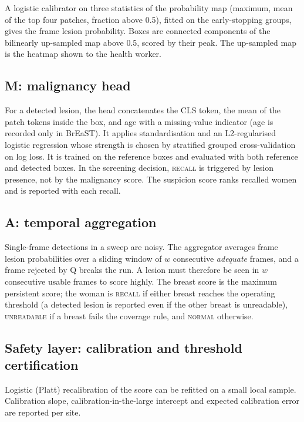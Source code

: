  A logistic calibrator on three statistics of the probability map (maximum, mean of the top four patches, fraction above 0.5), fitted on the early-stopping groups, gives the frame lesion probability. Boxes are connected components of the bilinearly up-sampled map above 0.5, scored by their peak. The up-sampled map is the heatmap shown to the health worker.

\subsection{M: malignancy head}
For a detected lesion, the head concatenates the CLS token, the mean of the patch tokens inside the box, and age with a missing-value indicator (age is recorded only in BrEaST). It applies standardisation and an L2-regularised logistic regression whose strength is chosen by stratified grouped cross-validation on log loss. It is trained on the reference boxes and evaluated with both reference and detected boxes. In the screening decision, \textsc{recall} is triggered by lesion presence, not by the malignancy score. The suspicion score ranks recalled women and is reported with each recall.

\subsection{A: temporal aggregation}
Single-frame detections in a sweep are noisy. The aggregator averages frame lesion probabilities over a sliding window of $w$ consecutive \emph{adequate} frames, and a frame rejected by Q breaks the run. A lesion must therefore be seen in $w$ consecutive usable frames to score highly. The breast score is the maximum persistent score; the woman is \textsc{recall} if either breast reaches the operating threshold (a detected lesion is reported even if the other breast is unreadable), \textsc{unreadable} if a breast fails the coverage rule, and \textsc{normal} otherwise.

\subsection{Safety layer: calibration and threshold certification}\label{sec:certify}
 Logistic (Platt) recalibration \cite{platt1999} of the score can be refitted on a small local sample. Calibration slope, calibration-in-the-large intercept and expected calibration error are reported per site.

